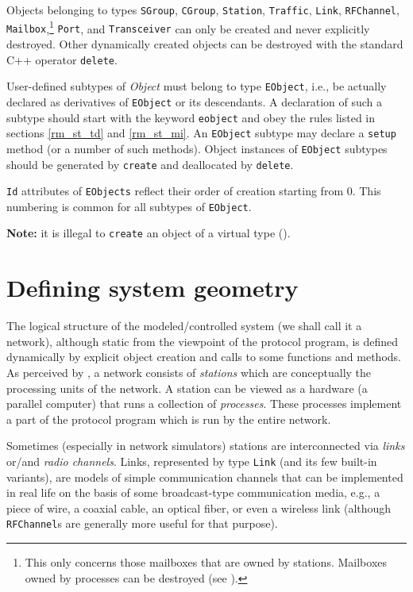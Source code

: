 Objects belonging to types {\tt SGroup}, {\tt CGroup}, {\tt Station},
{\tt Traffic}, {\tt Link}, {\tt RFChannel}, {\tt Mailbox},\footnote{This only
concerns those mailboxes that are owned by stations.
Mailboxes owned by processes can be destroyed (see ).}
{\tt Port}, and
{\tt Transceiver} can only be created and never explicitly destroyed.
Other dynamically created
objects can be destroyed with the standard C++ operator {\tt delete}.

User-defined subtypes of {\em Object\/} must belong to type {\tt EObject}, i.e.,
be actually declared as derivatives of {\tt EObject} or its descendants.
A declaration of such a subtype should start with the keyword {\tt eobject}
and obey the rules listed in sections \ref{rm_st_td} and \ref{rm_st_mi}.
An {\tt EObject} subtype
may declare a {\tt setup} method (or a number of such methods).
Object instances of {\tt EObject} subtypes should be generated
by {\tt create} and deallocated by {\tt delete}.

{\tt Id} attributes of {\tt EObjects} reflect their order of
creation starting from 0.
This numbering is common for all subtypes of {\tt EObject}.

\medskip

\noindent
{\bf Note:} it is illegal to {\tt create} an object of a virtual type
().

\section{Defining system geometry}
\label{rm_to}

The logical structure of the modeled/controlled
system (we shall call it a network), although static from the viewpoint
of the protocol program, is defined dynamically by explicit object creation
and calls to some functions and methods.
As perceived by \smurph, a network consists of {\em stations\/} which are
conceptually the processing units of the network.
A station can be viewed as a hardware
(a parallel computer) that runs a collection of {\em processes}.
These processes implement a part of the protocol program which is run by
the entire network.

Sometimes (especially in network simulators) stations
are interconnected via {\em links\/} or/and {\em radio channels}.
Links, represented by type {\tt Link} (and its few built-in variants),
are models of
simple communication channels that can be implemented in real life
on the basis of some broadcast-type communication media, e.g.,
a piece of wire, a coaxial cable, an optical fiber, or even a wireless link
(although {\tt RFChannel}s are generally more useful for that purpose).

